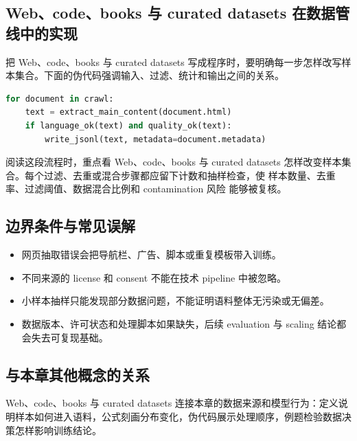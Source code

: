 \documentclass[a4paper]{article}
\begin{document}
\subsection{Web、code、books 与 curated datasets 在数据管线中的实现}
把 Web、code、books 与 curated datasets 写成程序时，要明确每一步怎样改写样本集合。下面的伪代码强调输入、过滤、统计和输出之间的关系。
\begin{lstlisting}[language=Python]
for document in crawl:
    text = extract_main_content(document.html)
    if language_ok(text) and quality_ok(text):
        write_jsonl(text, metadata=document.metadata)
\end{lstlisting}
阅读这段流程时，重点看 Web、code、books 与 curated datasets 怎样改变样本集合。每个过滤、去重或混合步骤都应留下计数和抽样检查，使 样本数量、去重率、过滤阈值、数据混合比例和 contamination 风险 能够被复核。
\subsection{边界条件与常见误解}
\begin{itemize}
\item 网页抽取错误会把导航栏、广告、脚本或重复模板带入训练。
\item 不同来源的 license 和 consent 不能在技术 pipeline 中被忽略。
\item 小样本抽样只能发现部分数据问题，不能证明语料整体无污染或无偏差。
\item 数据版本、许可状态和处理脚本如果缺失，后续 evaluation 与 scaling 结论都会失去可复现基础。
\end{itemize}
\subsection{与本章其他概念的关系}
Web、code、books 与 curated datasets 连接本章的数据来源和模型行为：定义说明样本如何进入语料，公式刻画分布变化，伪代码展示处理顺序，例题检验数据决策怎样影响训练结论。
\end{document}
